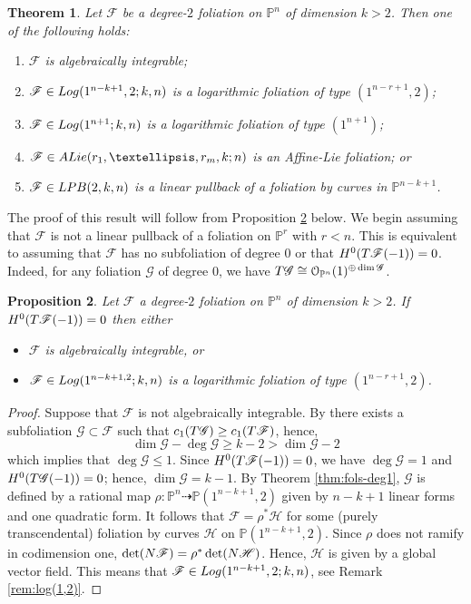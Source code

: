 \documentclass[twoside]{amsart}
\numberwithin{equation}{section}
\newcommand{\p}[1]{{\mathbb{P}^{#1}}}
\newcommand{\opn}{{\mathcal O}_{\mathbb{P}^{n}}}
\newcommand{\pn}{{\mathbb{P}^{n}}}
\def\PP{{\mathbb{P}}}
\newcommand{\sF}{\mathscr{F}}
\newcommand{\sG}{\mathscr{G}}
\newcommand{\sH}{\mathscr{H}}
\newcommand{\tF}{{\rm T}\sF}
\newcommand{\tG}{{\rm T}\sG}
\newcommand{\nF}{{\rm N}\sF}
\newcommand{\nH}{{\rm N}\sH}
\newcommand{\lpb}[3]{{\rm LPB }(#1,#2,#3)}
\newcommand{\logg}[3]{{\rm Log}(#1;#2,#3)}
\newcommand{\exc}[3]{{\rm ALie}(#1,#2;#3)}
\newtheorem{theorem}{Theorem}[section]
\newtheorem{proposition}[theorem]{Proposition}
\theoremstyle{definition}
\begin{document}
\begin{theorem}\label{thm:dim>2}
Let $\sF$ be a degree-$2$ foliation on $\pn$ of dimension $k>2$. Then one of the following holds:
\begin{enumerate}
    \item $\sF$ is algebraically integrable;
    \item $\sF \in \logg{1^{n-k+1},2}{k}{n}$ is a logarithmic foliation of type $(1^{n-r +1}, 2)$;
    \item $\sF \in \logg{1^{n+1}}{k}{n}$ is a logarithmic foliation of type $(1^{n+1})$;
    \item  $\sF \in \exc{r_1, \dots,r_m}{k}{n}$ is an Affine-Lie foliation; or
    \item $\sF \in \lpb{2}{k}{n}$ is a linear pullback of a foliation by curves in $\p{n-k+1}$.
\end{enumerate}
\end{theorem}
The proof of this result will follow from Proposition \ref{prop:ra=r-1=log} below. We begin assuming that $\sF$ is not a linear pullback of a foliation on $\p{r}$ with $r<n$. This is equivalent to assuming that $\sF$ has no subfoliation of degree $0$ or that $H^0(\tF(-1)) = 0$. Indeed, for any foliation $\sG$ of degree $0$, we have $\tG \cong \opn(1)^{\oplus \dim \sG}$.

\begin{proposition}\label{prop:ra=r-1=log}
Let $\sF$ a degree-$2$ foliation on $\pn$ of dimension $k >2$. If $H^0(\tF(-1)) = 0$ then either 
\begin{itemize}
    \item $\sF$ is algebraically integrable, or
    \item $\sF \in \logg{1^{n-k+1,2}}{k}{n}$ is a logarithmic foliation of type $(1^{n-r +1}, 2)$. 
\end{itemize}
\end{proposition}

\begin{proof} 
Suppose that $\sF$ is not algebraically integrable. By \cite[Proposition 7.5]{AD} there exists a subfoliation $\sG \subset \sF$ such that $c_1(\tG) \geq c_1(\tF)$, hence, 
\[
\dim \sG - \deg \sG \geq k - 2 > \dim \sG -2
\]
which implies that $\deg \sG \leq 1$. Since $H^0(\tF(-1)) = 0$, we have $\deg \sG = 1$ and $H^0(\tG(-1)) = 0$; hence, $\dim \sG = k-1$. By Theorem \ref{thm:fols-deg1}, $\sG$ is defined by a rational map $\rho \colon \pn \dashrightarrow \PP(1^{n-k+1}, 2)$ given by $n-k+1$ linear forms and one quadratic form. It follows that $\sF = \rho^*\sH$ for some (purely transcendental) foliation by curves $\sH$ on $\PP(1^{n-k+1}, 2)$. Since $\rho$
does not ramify in codimension one, $\det(\nF) = \rho^*\det(\nH)$. Hence, $\sH$ is given by a global vector field. This means that $\sF \in \logg{1^{n-k+1},2}{k}{n}$, see Remark \ref{rem:log(1,2)}. 
\end{proof}
\end{document}
